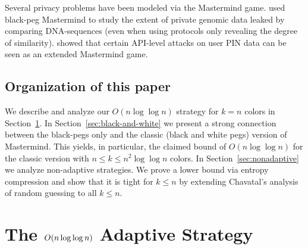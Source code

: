 \documentclass[english,a4paper,11pt]{article}
\newcommand{\eps}{{\varepsilon}}
\newcommand{\comment}[1]{{\bf [#1]}}
\newcommand{\CW}[1]{\comment{\textcolor{blue}{CW: #1}}}
\newcommand{\RS}[1]{\comment{\textcolor{red}{RS: #1}}}
\newcommand{\HT}[1]{\comment{\textcolor{green}{HT: #1}}}
\newcommand{\BD}[1]{\comment{\textcolor{blue}{BD: #1}}}
\newcommand{\ifLongCites}[2]{#1}
\newcommand{\ifLongCites}[2]{#2}
\begin{document}
{Several privacy problems have been modeled via the Mastermind game. \ifLongCites{\cite{Goodrich092}}{Goodrich~\cite{Goodrich092}} used black-peg Mastermind to study the extent of private genomic data leaked by comparing DNA-sequences (even when using protocols only revealing the degree of similarity). \ifLongCites{\cite{FocardiL10}}{Focardi and Luccio~\cite{FocardiL10}} showed that certain API-level attacks on user PIN data can be seen as an extended Mastermind game.


\subsection{Organization of this paper}

We describe and analyze our $O(n\log\log n)$ strategy for $k=n$ colors in Section~\ref{sec:nloglogn}. In Section~\ref{sec:black-and-white} we present a strong connection between the black-pegs only and the classic (black and white pegs) version of Mastermind. This yields, in particular, the claimed bound of $O(n\log\log n)$ for the classic version with $n\leq k \leq n^2 \log\log n$ colors. In Section~\ref{sec:nonadaptive} we analyze non-adaptive strategies. We prove a lower bound via entropy compression and show that it is tight for $k \le n$ by extending Chavatal's analysis of random guessing to all $k \le n$.

\section{The $O(\lowercase{n \log\log n})$ Adaptive Strategy}
\label{sec:nloglogn}


}
\end{document}
